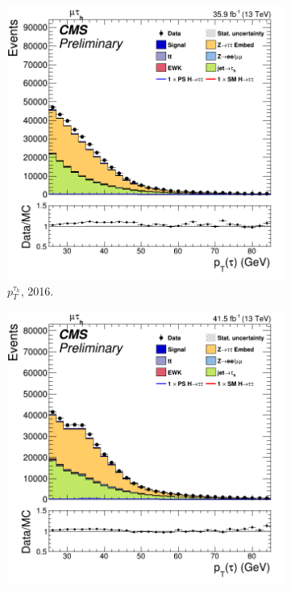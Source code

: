 \begin{figure}
    \begin{subfigure}[b]{0.33\linewidth}
    \centering
    \includegraphics[width=\linewidth]{Chapitre7/Images/CtrlPlots/2016/TaupT.png} 
    \caption{$p^{\tau_h}_T$, 2016.} 
    \vspace{0.5ex}
  \end{subfigure}%
  \begin{subfigure}[b]{0.33\linewidth}
    \centering
    \includegraphics[width=\linewidth]{Chapitre7/Images/CtrlPlots/2017/TaupT.png} 

\end{subfigure}
\end{figure}
